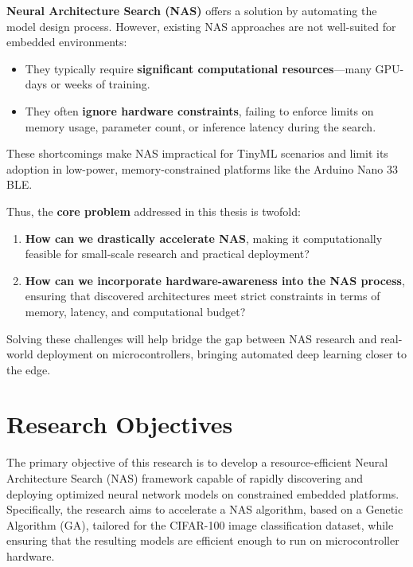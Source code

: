 \textbf{Neural Architecture Search (NAS)} offers a solution by automating the model design process. However, existing NAS approaches are not well-suited for embedded environments:
\begin{itemize}
    \item They typically require \textbf{significant computational resources}—many GPU-days or weeks of training.
    \item They often \textbf{ignore hardware constraints}, failing to enforce limits on memory usage, parameter count, or inference latency during the search.
\end{itemize}

These shortcomings make NAS impractical for TinyML scenarios and limit its adoption in low-power, memory-constrained platforms like the Arduino Nano 33 BLE.

Thus, the \textbf{core problem} addressed in this thesis is twofold:


\begin{enumerate}
    \item \textbf{How can we drastically accelerate NAS}, making it computationally feasible for small-scale research and practical deployment?
    \item \textbf{How can we incorporate hardware-awareness into the NAS process}, ensuring that discovered architectures meet strict constraints in terms of memory, latency, and computational budget?
\end{enumerate}

Solving these challenges will help bridge the gap between NAS research and real-world deployment on microcontrollers, bringing automated deep learning closer to the edge.








\section{Research Objectives}

The primary objective of this research is to develop a resource-efficient Neural Architecture Search (NAS) framework capable of rapidly discovering and deploying optimized neural network models on constrained embedded platforms. Specifically, the research aims to accelerate a NAS algorithm, based on a Genetic Algorithm (GA), tailored for the CIFAR-100 image classification dataset, while ensuring that the resulting models are efficient enough to run on microcontroller hardware.

